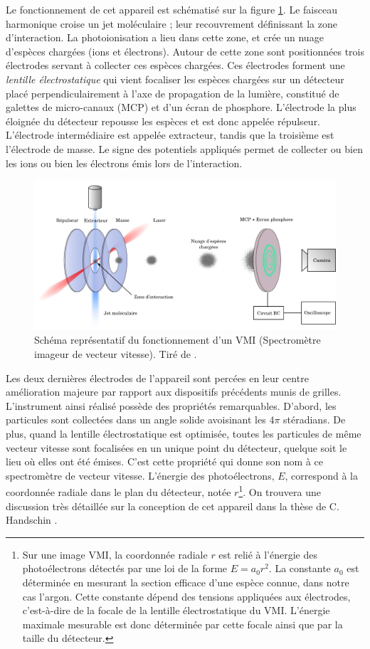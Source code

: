Le fonctionnement de cet appareil est schématisé sur la figure \ref{fig:vmi}. Le faisceau harmonique croise un jet moléculaire ; leur recouvrement définissant la zone d'interaction. La photoionisation a lieu dans cette zone, et crée un nuage d'espèces chargées (ions et électrons). Autour de cette zone sont positionnées trois électrodes servant à collecter ces espèces chargées. Ces électrodes forment une \textit{lentille électrostatique} qui vient focaliser les espèces chargées sur un détecteur placé perpendiculairement à l'axe de propagation de la lumière, constitué de galettes de micro-canaux (MCP) et d'un écran de phosphore. L'électrode la plus éloignée du détecteur repousse les espèces et est donc appelée répulseur. L'électrode intermédiaire est appelée extracteur, tandis que la troisième est l'électrode de masse. Le signe des potentiels appliqués permet de collecter ou bien les ions ou bien les électrons émis lors de l'interaction. 

\begin{figure}[!ht]
\centering
\includegraphics[width=1\columnwidth]{Figures/PECD/vmi.png}%
\caption{Schéma représentatif du fonctionnement d'un VMI (Spectromètre imageur de vecteur vitesse). Tiré de .}
\label{fig:vmi}
\end{figure}

Les deux dernières électrodes de l'appareil sont percées en leur centre  amélioration majeure par rapport aux dispositifs précédents munis de grilles. L'instrument ainsi réalisé possède des propriétés remarquables. D'abord, les particules sont collectées dans un angle solide avoisinant les $4\pi$ stéradians. De plus, quand la lentille électrostatique est optimisée, toutes les particules de même vecteur vitesse sont focalisées en un unique point du détecteur, quelque soit le lieu où elles ont été émises. C'est cette propriété qui donne son nom à ce spectromètre de vecteur vitesse. L'énergie des photoélectrons, $E$, correspond à la coordonnée radiale dans le plan du détecteur, notée $r$\footnote{Sur une image VMI, la coordonnée radiale $r$ est relié à l'énergie des photoélectrons détectés par une loi de la forme $E = a_0 r^2$. La constante $a_0$ est déterminée en mesurant la section efficace d'une espèce connue, dans notre cas l'argon. Cette constante dépend des tensions appliquées aux électrodes, c'est-à-dire de la focale de la lentille électrostatique du VMI. L'énergie maximale mesurable est donc déterminée par cette focale ainsi que par la taille du détecteur. }. On trouvera une discussion très détaillée sur la conception de cet appareil dans la thèse de C. Handschin .

